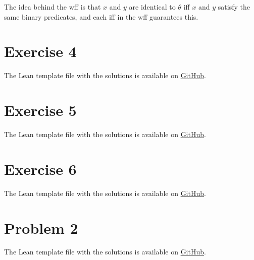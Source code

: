 \documentclass[11pt]{article}
\begin{document}
The idea behind the wff is that $x$ and $y$ are identical to $\theta$ iff $x$ and $y$ satisfy the same binary predicates, and each iff in the wff guarantees this.

\section*{Exercise 4}
The Lean template file with the solutions is available on \href{https://github.com/lucastassis/BU-CS511/blob/main/HW12/code/HW12.lean}{GitHub}.

\section*{Exercise 5}
The Lean template file with the solutions is available on \href{https://github.com/lucastassis/BU-CS511/blob/main/HW12/code/HW12.lean}{GitHub}.

\section*{Exercise 6}
The Lean template file with the solutions is available on \href{https://github.com/lucastassis/BU-CS511/blob/main/HW12/code/HW12.lean}{GitHub}.

\section*{Problem 2}
The Lean template file with the solutions is available on \href{https://github.com/lucastassis/BU-CS511/blob/main/HW12/code/HW12.lean}{GitHub}.
\end{document}
